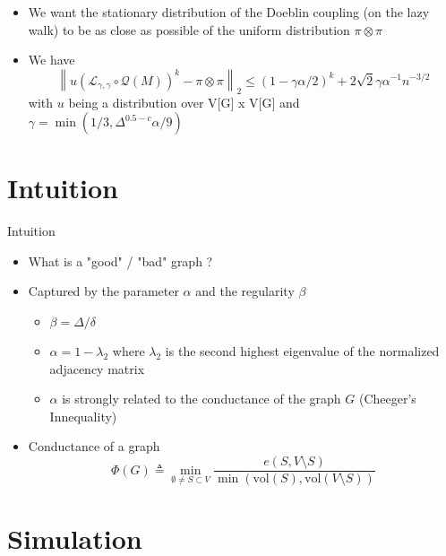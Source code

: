 \documentclass{beamer}
\newcommand{\norm}[1]{\left\lVert#1\right\rVert}
\begin{document}
\begin{frame}
\begin{itemize}


 \item We want the stationary distribution of the Doeblin coupling (on the lazy walk) to be as close as possible of the uniform distribution $\pi \otimes \pi$

\item We have 
\[
  \norm{u(\mathcal L_{\gamma,\gamma} \circ \mathcal Q(M))^k - \pi \otimes \pi}_2 \leq (1 - \gamma \alpha / 2)^k + 2 \sqrt 2 \gamma \alpha^{-1} n^{-3/2}
\]
with $u$ being a distribution over V[G] x V[G] and $\gamma = \min(1/3, \Delta^{0.5-c}\alpha/9)$

\end{itemize}
\end{frame}


\section{Intuition}

\frame{\sectionpage}

\begin{frame}{Intuition}
  \begin{itemize}
    \item What is a "good" / "bad" graph ? 
    \pause
    \item Captured by the parameter $\alpha$ and the regularity $\beta$
    \begin{itemize}
      \item $\beta = \Delta / \delta$
      \item $\alpha = 1 - \lambda_2$ where $\lambda_2$ is the second highest eigenvalue of the normalized adjacency matrix
      \item $\alpha$ is strongly related to the conductance of the graph $G$ (Cheeger's Innequality)
    \end{itemize}
    \pause
    \item Conductance of a graph
      \[
        \Phi(G) \triangleq \min_{\emptyset \not = S \subset V} \frac{e(S, V \setminus S)}{\min(\text{vol}(S), \text{vol}(V \setminus S))}
      \]
  \end{itemize}
\end{frame}


\section{Simulation}
\end{document}
